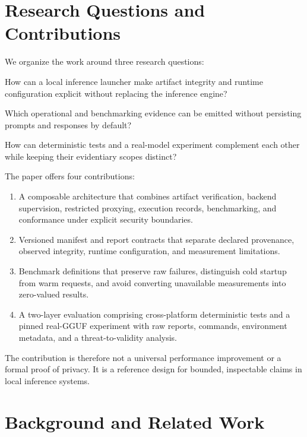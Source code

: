 \documentclass[11pt,a4paper]{article}
\begin{document}
\section{Research Questions and Contributions}

We organize the work around three research questions:

\begin{description}[leftmargin=1.5em,style=nextline]
\item[RQ1:] How can a local inference launcher make artifact integrity and runtime configuration explicit without replacing the inference engine?
\item[RQ2:] Which operational and benchmarking evidence can be emitted without persisting prompts and responses by default?
\item[RQ3:] How can deterministic tests and a real-model experiment complement each other while keeping their evidentiary scopes distinct?
\end{description}

The paper offers four contributions:

\begin{enumerate}
\item A composable architecture that combines artifact verification, backend supervision, restricted proxying, execution records, benchmarking, and conformance under explicit security boundaries.
\item Versioned manifest and report contracts that separate declared provenance, observed integrity, runtime configuration, and measurement limitations.
\item Benchmark definitions that preserve raw failures, distinguish cold startup from warm requests, and avoid converting unavailable measurements into zero-valued results.
\item A two-layer evaluation comprising cross-platform deterministic tests and a pinned real-GGUF experiment with raw reports, commands, environment metadata, and a threat-to-validity analysis.
\end{enumerate}

The contribution is therefore not a universal performance improvement or a formal proof of privacy. It is a reference design for bounded, inspectable claims in local inference systems.

\section{Background and Related Work}
\end{document}
